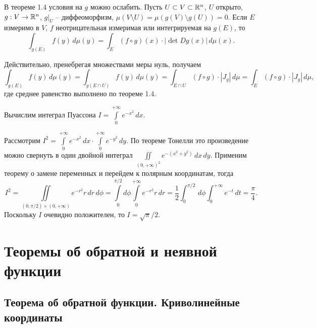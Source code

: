 \begin{note}
	В теореме 1.4 условия на $g$ можно ослабить. Пусть $U \subset V \subset \mathbb{R}^n$, $U$ открыто,
	$g : V \to \mathbb{R}^n$, $g|_{U}$ -- диффеоморфизм, $\mu(V \setminus U) = \mu( g(V) \setminus g(U) ) = 0$. 
	Если $E$ измеримо в $V$, $f$ неотрицательная измеримая или интегрируемая на $g(E)$, то
	\[ \int_{g(E)} f(y) \, d\mu(y) = \int_{E} (f \circ g)(x) \cdot |\det Dg(x)| \, d\mu(x). \]
\end{note}

\begin{myproof}
	Действительно, пренебрегая множествами меры нуль, получаем
	\[ \int_{g(E)} f(y) \, d\mu(y) = \int_{g(E \cap U)} f(y) \, d\mu(y) = \int_{E \cap U} (f \circ g) \cdot |J_g| \, d\mu = \int_{E} (f \circ g) \cdot |J_g| \, d\mu, \]
	где среднее равенство выполнено по теореме 1.4.
\end{myproof}

\begin{example}
	Вычислим интеграл Пуассона $I = \int \limits_{0}^{+\infty} e^{-x^2} \, dx$.
\end{example}

\begin{myproof}
	Рассмотрим $I^2 = \int \limits_{0}^{+\infty} e^{-x^2} \, dx \cdot \int \limits_{0}^{+\infty} e^{-y^2} \, dy$. 
	По теореме Тонелли это произведение можно свернуть в один двойной интеграл $\iint \limits_{(0, +\infty)^2} e^{-(x^2+y^2)} \, dx \, dy$. 
	Применим теорему о замене переменных и перейдем к полярным координатам, тогда 
	\[ I^2 = \iint \limits_{(0, \pi/2) \times (0, +\infty)} e^{-r^2} r \, dr \, d \phi = \int \limits_{0}^{\pi/2} d \phi \int \limits_{0}^{+\infty} e^{-r^2}r \, dr = \frac{1}{2} \int_0^{\pi/2} \, d \phi \int_0^{+\infty} e^{-t} \, dt = \frac{\pi}{4}. \]
	Поскольку $I$ очевидно положителен, то $I = \sqrt{\pi}/2$. 
\end{myproof}




\newpage





\section{Теоремы об обратной и неявной функции}

\subsection{Теорема об обратной функции. Криволинейные координаты}

